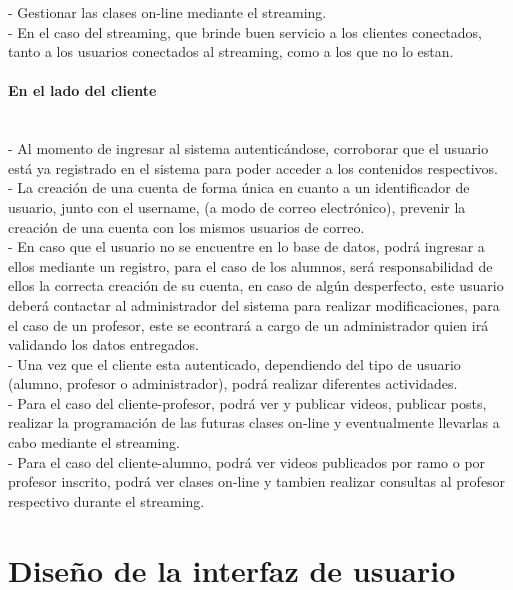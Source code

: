 \documentclass[12pt]{article}
\begin{document}
-	Gestionar las clases on-line mediante el streaming.\\

-	En el caso del streaming, que brinde buen servicio a los clientes conectados, tanto a los usuarios
conectados al streaming, como a los que no lo estan.\\

\paragraph{En el lado del cliente\\\\}

-	Al momento de ingresar al sistema autenticándose, corroborar que el usuario está ya registrado en
el sistema para poder acceder a los contenidos respectivos.\\

- 	La creación de una cuenta de forma única en cuanto a un identificador de usuario, junto con el username,
	(a modo de correo electrónico), prevenir la creación de una cuenta con los mismos usuarios de correo.\\

-	En caso que el usuario no se encuentre en lo base de datos, podrá ingresar a ellos mediante un 
registro, para el caso de los alumnos, será responsabilidad de ellos la correcta creación de su cuenta,
en caso de algún desperfecto, este usuario deberá contactar al administrador del sistema para realizar 
modificaciones, para el caso de un profesor, este se econtrará a cargo de un administrador quien irá validando 
los datos entregados.\\

-	Una vez que el cliente esta autenticado, dependiendo del tipo de usuario (alumno, profesor o 
administrador), podrá realizar diferentes actividades.\\

-	Para el caso del cliente-profesor, podrá ver y publicar videos, publicar posts, realizar la programación 
de las futuras clases on-line y eventualmente llevarlas a cabo mediante el streaming.\\

-	Para el caso del cliente-alumno, podrá ver videos publicados por ramo o por profesor
inscrito, podrá ver clases on-line y tambien realizar consultas al profesor respectivo durante el 
streaming.

\newpage
\section{Dise\~no de la interfaz de usuario}
\end{document}
